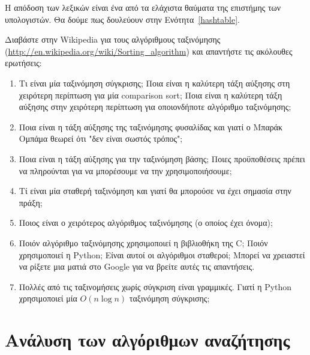 \documentclass[10pt]{book}
\begin{document}
Η απόδοση των λεξικών είναι ένα από τα ελάχιστα θαύματα της επιστήμης των 
υπολογιστών. Θα δούμε πως δουλεύουν στην Ενότητα~\ref{hashtable}. 
\\


\begin{exercise}

Διαβάστε στην Wikipedia για τους αλγόριθμους ταξινόμησης (\url{http://en.wikipedia.org/wiki/Sorting_algorithm})
και απαντήστε τις ακόλουθες ερωτήσεις: 

\begin{enumerate}

\item Τι είναι μία ταξινόμηση σύγκρισης;  Ποια είναι η καλύτερη τάξη    
  αύξησης στη χειρότερη περίπτωση για μία comparison sort;  Ποια είναι η
  καλύτερη τάξη αύξησης στην χειρότερη περίπτωση για οποιονδήποτε αλγόριθμο 
  ταξινόμησης; 

\item Ποια είναι η τάξη αύξησης της ταξινόμησης φυσαλίδας και γιατί ο Μπαράκ   
  Ομπάμα θεωρεί ότι "δεν είναι σωστός τρόπος"; 

\item Ποια είναι η τάξη αύξησης για την ταξινόμηση βάσης;  Ποιες 
  προϋποθέσεις πρέπει να πληρούνται για να μπορέσουμε να την χρησιμοποιήσουμε; 

\item Τί είναι μία σταθερή ταξινόμηση και γιατί θα μπορούσε να έχει σημασία στην 
  πράξη; 

\item Ποιος είναι ο χειρότερος αλγόριθμος ταξινόμησης (ο οποίος έχει όνομα); 

\item Ποιόν αλγόριθμο ταξινόμησης χρησιμοποιεί η βιβλιοθήκη της C; Ποιόν
  χρησιμοποιεί η Python;  Είναι αυτοί οι αλγόριθμοι σταθεροί;  Μπορεί να 
  χρειαστεί να ρίξετε μια ματιά στο Google για να βρείτε αυτές τις απαντήσεις.

\item Πολλές από τις ταξινομήσεις χωρίς σύγκριση είναι γραμμικές. Γιατί η  
  Python χρησιμοποιεί μία $O(n \log n)$ ταξινόμηση σύγκρισης; 

\end{enumerate}
\end{exercise}



\section{Ανάλυση των αλγόριθμων αναζήτησης}
\end{document}
